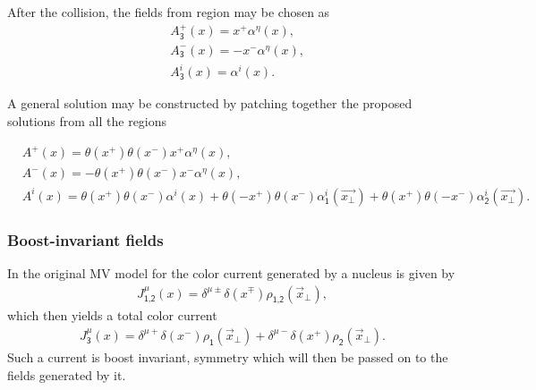 After the collision, the fields from region {} may be chosen as
\begin{equation}\label{sglasma7}
\begin{aligned}
    &A^+_\textsf{3}(x)=x^+\alpha^\eta(x),\\
    &A^-_\textsf{3}(x)=-x^-\alpha^\eta(x),\\
    &A^i_\textsf{3}(x)=\alpha^i(x).
\end{aligned}    
\end{equation}

A general solution may be constructed by patching together the proposed solutions from all the regions
\begin{fullwidth}
\begin{subequations}
\begin{align}
    &A^+(x)=\theta(x^+)\theta(x^-)x^+\alpha^\eta(x),\label{sglasma9a}\\
    &A^-(x)=-\theta(x^+)\theta(x^-)x^-\alpha^\eta(x),\label{sglasma9b}\\
    &A^i(x)=\theta(x^+)\theta(x^-)\alpha^i(x)+\theta(-x^+)\theta(x^-)\alpha^i_\textsf{1}(\vec{x_\perp})+\theta(x^+)\theta(-x^-)\alpha^i_\textsf{2}(\vec{x_\perp}).\label{sglasma9c}
\end{align}
\end{subequations}
\end{fullwidth}


\subsubsection*{Boost-invariant fields} 
In the original {\sffamily MV} model for the color current generated by a nucleus is given by
\begin{align}\label{sglasma29}
    J^\mu_{\textsf{1},\textsf{2}}(x)=\delta^{\mu\pm}\delta(x^\mp)\rho_{\textsf{1},\textsf{2}}(\vec{x}_\perp),
\end{align}
which then yields a total color current
\begin{align*}
    J^\mu_\textsf{3}(x)=\delta^{\mu+}\delta(x^-)\rho_\textsf{1}(\vec{x}_\perp)+\delta^{\mu-}\delta(x^+)\rho_\textsf{2}(\vec{x}_\perp).
\end{align*}
Such a current is boost invariant, symmetry which will then be passed on to the fields generated by it. 

